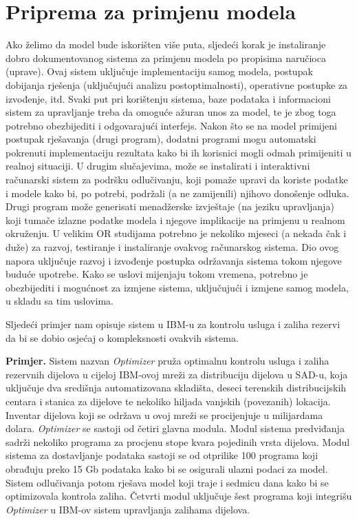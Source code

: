 \documentclass[a4paper, utf8, 11pt, colorlinks]{book}
\begin{document}
\section{Priprema za primjenu modela}
Ako želimo da model bude iskorišten više puta, sljedeći  korak je instaliranje dobro dokumentovanog sistema za primjenu modela po propisima naručioca (uprave). Ovaj sistem uključuje implementaciju samog modela, postupak dobijanja rješenja (uključujući analizu postoptimalnosti), operativne postupke za izvođenje, itd. %
Svaki put pri korištenju sistema, baze podataka i informacioni sistem za upravljanje treba da omoguće ažuran unos za model, te je zbog toga potrebno obezbijediti i odgovarajući interfejs. Nakon što se na model primijeni postupak rješavanja (drugi program), dodatni  programi mogu automatski pokrenuti implementaciju rezultata kako bi ih korisnici mogli odmah primijeniti u realnoj situaciji. U drugim slučajevima, može se instalirati i interaktivni računarski sistem  za podršku odlučivanju, koji pomaže upravi da koriste podatke i modele kako bi, po potrebi, podržali (a ne zamijenili) njihovo donošenje odluka. Drugi program može generisati menadžerske izvještaje (na jeziku upravljanja) koji tumače izlazne podatke modela i njegove implikacije na primjenu u realnom okruženju.  U velikim OR studijama potrebno je nekoliko mjeseci (a nekada čak i duže) za razvoj, testiranje i instaliranje ovakvog računarskog sistema. Dio ovog napora uključuje razvoj i izvođenje postupka održavanja sistema  tokom njegove buduće upotrebe. Kako se uslovi mijenjaju tokom vremena, potrebno je obezbijediti i mogućnost za  izmjene sistema, uključujući i izmjene samog modela, u skladu sa tim uslovima.  

Sljedeći primjer nam opisuje sistem u IBM-u za kontrolu usluga i zaliha rezervi da bi se dobio osjećaj o kompleksnosti ovakvih sistema.  

\textbf{Primjer.}
Sistem nazvan \emph{Optimizer} pruža optimalnu kontrolu usluga i zaliha rezervnih dijelova u cijeloj IBM-ovoj mreži za distribuciju dijelova u SAD-u, koja uključuje dva središnja
automatizovana skladišta, deseci terenskih distribucijskih centara i stanica za dijelove te nekoliko hiljada vanjskih (povezanih) lokacija. Inventar dijelova koji se održava u ovoj mreži se procijenjuje u milijardama dolara. \emph{Optimizer} se sastoji od četiri glavna modula. Modul sistema predviđanja sadrži nekoliko programa za procjenu stope kvara pojedinih vrsta dijelova. Modul sistema za dostavljanje podataka sastoji se od otprilike 100 programa koji    obrađuju
preko 15 Gb podataka kako bi se osigurali ulazni podaci za model. Sistem odlučivanja potom rješava model koji traje i  sedmicu dana kako bi se optimizovala kontrola zaliha. Četvrti modul uključuje šest programa koji integrišu \emph{Optimizer} u IBM-ov sistem upravljanja zalihama dijelova. %
\end{document}
